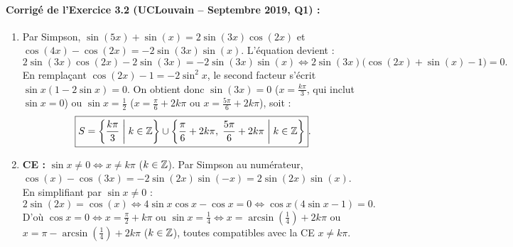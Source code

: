 \paragraph{Corrigé de l'Exercice 3.2 (UCLouvain -- Septembre 2019, Q1) :}
\begin{enumerate}[label=(\alph*)]
    \item Par Simpson, $\sin(5x)+\sin(x) = 2\sin(3x)\cos(2x)$ et $\cos(4x)-\cos(2x) = -2\sin(3x)\sin(x)$. L'équation devient :
    \[
        2\sin(3x)\cos(2x) - 2\sin(3x) = -2\sin(3x)\sin(x) \iff 2\sin(3x)\bigl(\cos(2x) + \sin(x) - 1\bigr) = 0.
    \]
    En remplaçant $\cos(2x) - 1 = -2\sin^2 x$, le second facteur s'écrit $\sin x(1 - 2\sin x) = 0$. On obtient donc $\sin(3x) = 0$ ($x = \frac{k\pi}{3}$, qui inclut $\sin x = 0$) ou $\sin x = \frac{1}{2}$ ($x = \frac{\pi}{6} + 2k\pi$ ou $x = \frac{5\pi}{6} + 2k\pi$), soit :
    \[
        \boxed{S = \left\{\frac{k\pi}{3} \;\middle|\; k\in\mathbb{Z}\right\} \cup \left\{\frac{\pi}{6} + 2k\pi,\; \frac{5\pi}{6} + 2k\pi \;\middle|\; k\in\mathbb{Z}\right\}}.
    \]
    \item \textbf{CE :} $\sin x \neq 0 \iff x \neq k\pi$ ($k\in\mathbb{Z}$). Par Simpson au numérateur, $\cos(x) - \cos(3x) = -2\sin(2x)\sin(-x) = 2\sin(2x)\sin(x)$. En simplifiant par $\sin x \neq 0$ :
    \[
        2\sin(2x) = \cos(x) \iff 4\sin x\cos x - \cos x = 0 \iff \cos x(4\sin x - 1) = 0.
    \]
    D'où $\cos x = 0 \iff x = \frac{\pi}{2} + k\pi$ ou $\sin x = \frac{1}{4} \iff x = \arcsin\left(\frac{1}{4}\right) + 2k\pi$ ou $x = \pi - \arcsin\left(\frac{1}{4}\right) + 2k\pi$ ($k\in\mathbb{Z}$), toutes compatibles avec la CE $x \neq k\pi$.
\end{enumerate}

